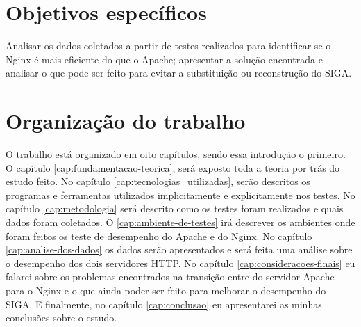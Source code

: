 \section{Objetivos específicos}
Analisar os dados coletados a partir de testes realizados para identificar se o 
Nginx é mais eficiente do que o Apache; apresentar a solução encontrada e 
analisar o que pode ser feito para evitar a substituição ou reconstrução do 
SIGA.\\
\section{Organização do trabalho}
O trabalho está organizado em oito capítulos, sendo essa introdução o primeiro. 
O capítulo \ref{cap:fundamentacao-teorica}, será exposto toda a teoria por trás 
do estudo feito. No capítulo \ref{cap:tecnologias_utilizadas}, serão descritos 
os programas e ferramentas utilizados implicitamente e explicitamente nos 
testes. No capítulo \ref{cap:metodologia} será descrito como os testes foram 
realizados e quais dados foram coletados. O \ref{cap:ambiente-de-testes} irá 
descrever os ambientes onde foram feitos os teste de desempenho do Apache e do 
Nginx. No capítulo \ref{cap:analise-dos-dados} os dados serão apresentados e 
será feita uma análise sobre o desempenho dos dois servidores HTTP. No capítulo 
\ref{cap:consideracoes-finais} eu falarei sobre os problemas encontrados na 
transição entre do servidor Apache para o Nginx e o que ainda poder ser feito 
para melhorar o desempenho do SIGA. E finalmente, no capítulo 
\ref{cap:conclusao} eu apresentarei as minhas conclusões sobre o estudo.\\
